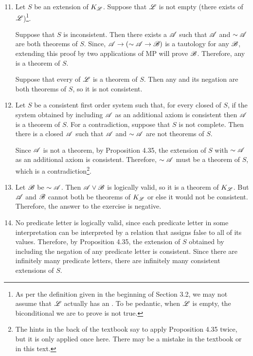 \solutions{}
\begin{enumerate}
  \setcounter{enumi}{10}
  \item %
    Let \(S\) be an extension of \(K_{\mathscr{L}}\). Suppose that \(\mathscr{L}\) is not empty (there exists \wfs{} of \(\mathscr{L}\))\footnote{As per the definition given in the beginning of Section 3.2, we may not assume that \(\mathscr{L}\) actually has an \wfs{}. To be pedantic, when \(\mathscr{L}\) is empty, the biconditional we are to prove is not true.}.

    \Ra{} Suppose that \(S\) is inconsistent. Then there exists a \wf{} \(\mathscr{A}\) such that \(\mathscr{A}\) and \(\sim\mathscr{A}\) are both theorems of \(S\). Since, \(\mathscr{A} \rightarrow (\sim\mathscr{A} \rightarrow \mathscr{B})\) is a tautology for any \wf{} \(\mathscr{B}\), extending this proof by two applications of MP will prove \(\mathscr{B}\). Therefore, any \wf{} is a theorem of \(S\).

    \La{} Suppose that every \wf{} of \(\mathscr{L}\) is a theorem of \(S\). Then any \wf{} and its negation are both theorems of \(S\), so it is not consistent.

  \item %
    Let \(S\) be a consistent first order system such that, for every closed \wf{} of \(S\), if the system obtained by including \(\mathscr{A}\) as an additional axiom is consistent then \(\mathscr{A}\) is a theorem of \(S\). For a contradiction, suppose that \(S\) is not complete. Then there is a closed \wf{} \(\mathscr{A}\) such that \(\mathscr{A}\) and \(\sim\mathscr{A}\) are not theorems of \(S\). 

    Since \(\mathscr{A}\) is not a theorem, by Proposition 4.35, the extension of \(S\) with \(\sim\mathscr{A}\) as an additional axiom is consistent. Therefore, \(\sim\mathscr{A}\) must be a theorem of \(S\), which is a contradiction\footnote{The hints in the back of the textbook say to apply Proposition 4.35 twice, but it is only applied once here. There may be a mistake in the textbook or in this text.}.
    
  \item %
    Let \(\mathscr{B}\) be \(\sim\mathscr{A}\). Then \(\mathscr{A} \lor \mathscr{B}\) is logically valid, so it is a theorem of \(K_{\mathscr{L}}\). But \(\mathscr{A}\) and \(\mathscr{B}\) cannot both be theorems of \(K_{\mathscr{L}}\) or else it would not be consistent. Therefore, the answer to the exercise is negative.

  \item %
    No predicate letter is logically valid, since each predicate letter in some interpretation can be interpreted by a relation that assigns false to all of its values. Therefore, by Proposition 4.35, the extension of \(S\) obtained by including the negation of any predicate letter is consistent. Since there are infinitely many predicate letters, there are infinitely many consistent extensions of \(S\).
\end{enumerate}
